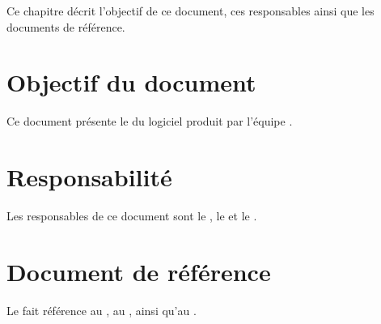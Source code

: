 	Ce chapitre décrit l'objectif de ce document, ces responsables ainsi que les documents de référence.

\section{Objectif du document}
	Ce document présente le \PTI{} du logiciel produit par l'équipe \nomEquipe{}.
	
\section{Responsabilité}
	Les responsables de ce document sont le \CP, le \RQ{} et le \RD.
	
\section{Document de référence}
	Le \PTI{} fait référence au \JTI, au \PTU, ainsi qu'au \JTU.
